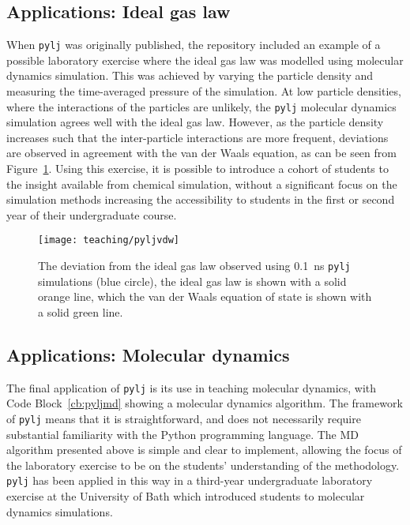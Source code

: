 \subsection{Applications: Ideal gas law}
When \texttt{pylj} was originally published,\autocite{mccluskey_pylj_2018} the repository included an example of a possible laboratory exercise where the ideal gas law was modelled using molecular dynamics simulation.
This was achieved by varying the particle density and measuring the time-averaged pressure of the simulation.
At low particle densities, where the interactions of the particles are unlikely, the \texttt{pylj} molecular dynamics simulation agrees well with the ideal gas law.
However, as the particle density increases such that the inter-particle interactions are more frequent, deviations are observed in agreement with the van der Waals equation, as can be seen from Figure~\ref{fig:vdw}.
Using this exercise, it is possible to introduce a cohort of students to the insight available from chemical simulation, without a significant focus on the simulation methods increasing the accessibility to students in the first or second year of their undergraduate course.
%
\begin{figure}
    \centering
    \texttt{[image: teaching/pyljvdw]}
    \caption{The deviation from the ideal gas law observed using \SI{0.1}{\nano\second} \texttt{pylj} simulations (blue circle), the ideal gas law is shown with a solid orange line, which the van der Waals equation of state is shown with a solid green line.}
    \label{fig:vdw}
\end{figure}
%

\subsection{Applications: Molecular dynamics}
The final application of \texttt{pylj} is its use in teaching molecular dynamics, with Code Block~\ref{cb:pyljmd} showing a molecular dynamics algorithm.
The framework of \texttt{pylj} means that it is straightforward, and does not necessarily require substantial familiarity with the Python programming language.
The MD algorithm presented above is simple and clear to implement, allowing the focus of the laboratory exercise to be on the students' understanding of the methodology.
\texttt{pylj} has been applied in this way in a third-year undergraduate laboratory exercise at the University of Bath which introduced students to molecular dynamics simulations.

